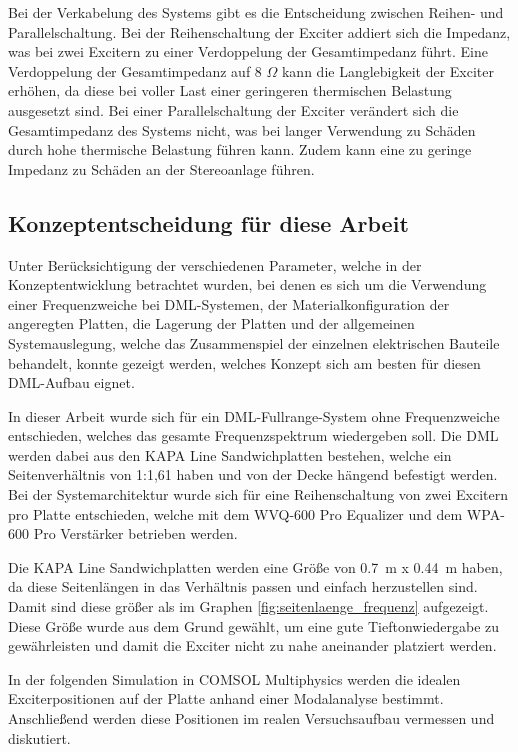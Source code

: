Bei der Verkabelung des Systems gibt es die Entscheidung zwischen Reihen- und Parallelschaltung. Bei der Reihenschaltung der Exciter addiert sich die Impedanz, was bei zwei Excitern zu einer Verdoppelung der Gesamtimpedanz führt. Eine Verdoppelung der Gesamtimpedanz auf 8 $\Omega$ kann die Langlebigkeit der Exciter erhöhen, da diese bei voller Last einer geringeren thermischen Belastung ausgesetzt sind.
Bei einer Parallelschaltung der Exciter verändert sich die Gesamtimpedanz des Systems nicht, was bei langer Verwendung zu Schäden durch hohe thermische Belastung führen kann. Zudem kann eine zu geringe Impedanz zu Schäden an der Stereoanlage führen.


\subsection{Konzeptentscheidung für diese Arbeit}

Unter Berücksichtigung der verschiedenen Parameter, welche in der Konzeptentwicklung betrachtet wurden, bei denen es sich um die Verwendung einer Frequenzweiche bei DML-Systemen, der Materialkonfiguration der angeregten Platten, die Lagerung der Platten und der allgemeinen Systemauslegung, welche das Zusammenspiel der einzelnen elektrischen Bauteile behandelt, konnte gezeigt werden, welches Konzept sich am besten für diesen DML-Aufbau eignet.

In dieser Arbeit wurde sich für ein DML-Fullrange-System ohne Frequenzweiche entschieden, welches das gesamte Frequenzspektrum wiedergeben soll. Die DML werden dabei aus den KAPA Line Sandwichplatten bestehen, welche ein Seitenverhältnis von 1:1,61 haben und von der Decke hängend befestigt werden. Bei der Systemarchitektur wurde sich für eine Reihenschaltung von zwei Excitern pro Platte entschieden, welche mit dem WVQ-600 Pro Equalizer und dem WPA-600 Pro Verstärker betrieben werden. 

Die KAPA Line Sandwichplatten werden eine Größe von \SI{0,7}{\meter} x \SI{0,44}{\meter} haben, da diese Seitenlängen in das Verhältnis passen und einfach herzustellen sind. Damit sind diese größer als im Graphen \ref{fig:seitenlaenge_frequenz} aufgezeigt. Diese Größe wurde aus dem Grund gewählt, um eine gute Tieftonwiedergabe zu gewährleisten und damit die Exciter nicht zu nahe aneinander platziert werden. 

In der folgenden Simulation in COMSOL Multiphysics werden die idealen Exciterpositionen auf der Platte anhand einer Modalanalyse bestimmt. Anschließend werden diese Positionen im realen Versuchsaufbau vermessen und diskutiert.


